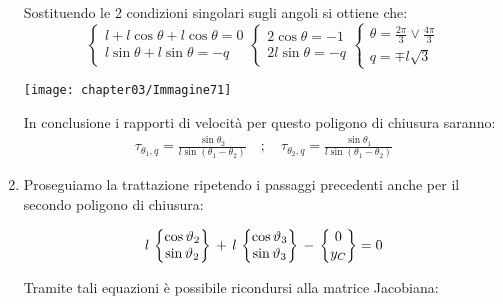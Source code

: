 \begin{enumerate}
\begin{minipage}{.65\textwidth}
			 Sostituendo le 2 condizioni singolari sugli angoli si ottiene che:
			 \[
			 \begin{cases}
			 l + l\cos{\theta} + l\cos{\theta} = 0\\
			 l \sin{\theta} + l\sin{\theta} = - q
			 \end{cases}
			 \begin{cases}
			 2 \cos{\theta} = -1\\
			 2l\sin{\theta}= -q
			 \end{cases}
			 \begin{cases}
			 \theta = \frac{2\pi}{3} \lor \frac{4 \pi }{3} \\
			 q = \mp l \sqrt{3}
			 \end{cases}
			  \]
			 \end{minipage}
			 \hfill
			 \begin{minipage}{.35\textwidth}
			 \centering
			 \texttt{[image: chapter03/Immagine71]}
			 \end{minipage}			 
			 
			 In conclusione i rapporti di velocità per questo poligono di chiusura saranno:
			 \begin{gather*}
			 \tau_{\theta_1,q} = \frac{\sin{\theta_2}}{l \sin{(\theta_1-\theta_2)}}\quad;\quad \tau_{\theta_2,q} = \frac{\sin{\theta_1}}{l \sin{(\theta_1-\theta_2)}}
			 \end{gather*}
			 
			 \item Proseguiamo la trattazione ripetendo i passaggi precedenti anche per il secondo poligono di chiusura:
			 
			 \[
			 l\,\begin{Bmatrix}\cos{\vartheta_2}\\\sin{\vartheta_2}\end{Bmatrix}\,+\,l\,\begin{Bmatrix}\cos{\vartheta_3}\\\sin{\vartheta_3}\end{Bmatrix}\,-\,\begin{Bmatrix}0\\y_C\end{Bmatrix}=0
			 \]
			 
			 Tramite tali equazioni è possibile ricondursi alla matrice Jacobiana:
			 

\end{enumerate}
